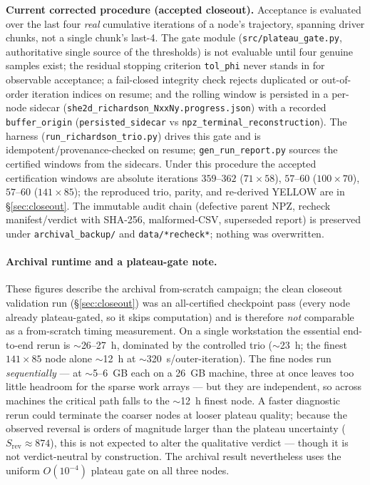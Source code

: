 \documentclass[11pt]{article}
\begin{document}
\textbf{Current corrected procedure (accepted closeout).} Acceptance is evaluated over the last four
\emph{real} cumulative iterations of a node's trajectory, spanning driver chunks, not a single chunk's
last-4. The gate module (\texttt{src/plateau\_gate.py}, authoritative single source of the thresholds)
is not evaluable until four genuine samples exist; the residual stopping criterion \texttt{tol\_phi}
never stands in for observable acceptance; a fail-closed integrity check rejects duplicated or
out-of-order iteration indices on resume; and the rolling window is persisted in a per-node sidecar
(\texttt{she2d\_richardson\_NxxNy.progress.json}) with a recorded \texttt{buffer\_origin}
(\texttt{persisted\_sidecar} vs \texttt{npz\_terminal\_reconstruction}). The harness
(\texttt{run\_richardson\_trio.py}) drives this gate and is idempotent/provenance-checked on resume;
\texttt{gen\_run\_report.py} sources the certified windows from the sidecars. Under this procedure the
accepted certification windows are absolute iterations $359$--$362$ ($71\times58$), $57$--$60$
($100\times70$), $57$--$60$ ($141\times85$); the reproduced trio, parity, and re-derived YELLOW are in
\S\ref{sec:closeout}. The immutable audit chain (defective parent NPZ, recheck manifest/verdict with
SHA-256, malformed-CSV, superseded report) is preserved under \texttt{archival\_backup/} and
\texttt{data/*recheck*}; nothing was overwritten.

\paragraph{Archival runtime and a plateau-gate note.} These figures describe the archival from-scratch
campaign; the clean closeout validation run (\S\ref{sec:closeout}) was an all-certified checkpoint pass
(every node already plateau-gated, so it skips computation) and is therefore \emph{not} comparable as a
from-scratch timing measurement. On a single workstation the essential end-to-end rerun
is $\sim$26--27~h, dominated by the controlled trio ($\sim$23~h; the finest $141\times85$ node alone
$\sim$12~h at $\sim$320~s/outer-iteration). The fine nodes run \emph{sequentially} --- at $\sim$5--6~GB
each on a 26~GB machine, three at once leaves too little headroom for the sparse work arrays --- but
they are independent, so across machines the critical path falls to the $\sim$12~h finest node. A
faster diagnostic rerun could terminate the coarser nodes at looser plateau quality; because the
observed reversal is orders of magnitude larger than the plateau uncertainty ($S_{\mathrm{rev}}\approx
874$), this is not expected to alter the qualitative verdict --- though it is not verdict-neutral by
construction. The archival result nevertheless uses the uniform $O(10^{-4})$ plateau gate on all three
nodes.
\end{document}
